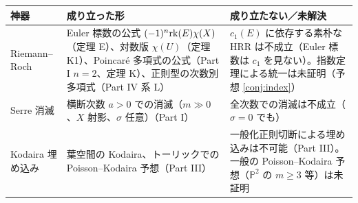 \begin{center}\small
\begin{tabular}{>{\raggedright\arraybackslash}p{2.6cm}>{\raggedright\arraybackslash}p{6.2cm}>{\raggedright\arraybackslash}p{6.0cm}}
\toprule 神器 & 成り立った形 & 成り立たない／未解決\\\midrule
Riemann--Roch & Euler 標数の公式 $(-1)^n\mathrm{rk}(E)\chi(X)$（定理 E）、対数版 $\chi(U)$（定理 K1）、Poincar\'e 多項式の公式（Part I $n=2$、定理 K）、正則型の次数別多項式（Part IV 系 L） & $c_1(E)$ に依存する素朴な HRR は不成立（Euler 標数は $c_1$ を見ない）。指数定理による統一は未証明（予想 \ref{conj:index}）\\\midrule
Serre 消滅 & 横断次数 $a>0$ での消滅（$m\gg0$、$X$ 射影、$\sigma$ 任意）（Part I） & 全次数での消滅は不成立（$\sigma=0$ でも）\\\midrule
Kodaira 埋め込み & 葉空間の Kodaira、トーリックでの Poisson--Kodaira 予想（Part III） & 一般化正則切断による埋め込みは不可能（Part III）。一般の Poisson--Kodaira 予想（$\mathbb P^2$ の $m\ge3$ 等）は未証明\\\bottomrule
\end{tabular}
\end{center}


